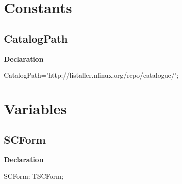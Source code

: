 \documentclass{report}
\newif\ifpdf
\begin{document}
\section{Constants}
\ifpdf
\subsection*{\large{\textbf{CatalogPath}}\normalsize\hspace{1ex}\hrulefill}
\else
\subsection*{CatalogPath}
\fi
\label{swcatalog-CatalogPath}
\begin{list}{}{
\setlength{\itemindent}{0cm}
\setlength{\listparindent}{0cm}
\setlength{\leftmargin}{\evensidemargin}
\addtolength{\leftmargin}{\tmplength}
\settowidth{\labelsep}{X}
\addtolength{\leftmargin}{\labelsep}
\setlength{\labelwidth}{\tmplength}
}
\item[\textbf{Declaration}\hfill]
\ifpdf
\begin{flushleft}
\fi
\begin{ttfamily}
CatalogPath='http://listaller.nlinux.org/repo/catalogue/';\end{ttfamily}

\ifpdf
\end{flushleft}
\fi

\end{list}
\section{Variables}
\ifpdf
\subsection*{\large{\textbf{SCForm}}\normalsize\hspace{1ex}\hrulefill}
\else
\subsection*{SCForm}
\fi
\label{swcatalog-SCForm}
\begin{list}{}{
\setlength{\itemindent}{0cm}
\setlength{\listparindent}{0cm}
\setlength{\leftmargin}{\evensidemargin}
\addtolength{\leftmargin}{\tmplength}
\settowidth{\labelsep}{X}
\addtolength{\leftmargin}{\labelsep}
\setlength{\labelwidth}{\tmplength}
}
\item[\textbf{Declaration}\hfill]
\ifpdf
\begin{flushleft}
\fi
\begin{ttfamily}
SCForm: TSCForm;\end{ttfamily}

\ifpdf
\end{flushleft}
\fi

\end{list}
\ifpdf
\end{document}
